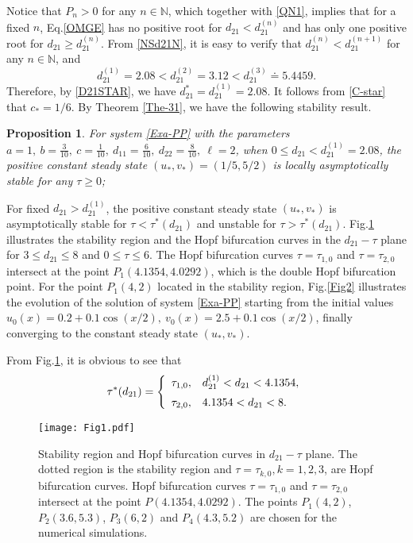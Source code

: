 \documentclass[11pt]{article}
\newtheorem{proposition}[theorem]{Proposition}
\theoremstyle{definition}
\theoremstyle{remark}
\numberwithin{equation}{section}
\begin{document}
Notice that $P_n>0$ for any $n\in \mathbb{N}$, which together with \eqref{QN1}, implies that for a fixed $n$,
 Eq.\eqref{OMGE} has no positive root for
$d_{21}<d_{21}^{(n)}$ and has only one positive root for $d_{21}\geq d_{21}^{(n)}$.
From \eqref{NSd21N},  it is easy to verify that $d_{21}^{(n)}<d_{21}^{(n+1)}$  for any $n\in \mathbb{N}$, and
$$
d_{21}^{(1)}=2.08< d_{21}^{(2)}=3.12<d_{21}^{(3)} \doteq 5.4459 .
$$
 Therefore,  by \eqref{D21STAR}, we have    $d_{21}^*=d_{21}^{(1)}=2.08$.   It follows from \eqref{C-star} that $c_*=1/6$. By Theorem  \eqref{The-31},  we  have the following stability result.
 \begin{proposition}
 \label{Pro-1}
For system \eqref{Exa-PP}  with the parameters $a=1, ~b=\frac{3}{10}, ~c=\frac{1}{10}, ~d_{11}=\frac{6}{10}, ~d_{22}=\frac{8}{10},~\ell=2$,
when $0\leq d_{21} < d_{21}^{(1)}=2.08$,   the positive constant steady state $(u_*, v_*)=(1/5,  5/2)$     is locally  asymptotically stable   for any $\tau\geq 0$;
  \end{proposition}
For fixed  $d_{21}>d_{21}^{(1)}$,    the positive constant steady state $(u_*, v_*)$  is asymptotically stable for $\tau<\tau^*(d_{21})$ and unstable for $\tau>\tau^*(d_{21})$.
 Fig.\ref{Fig1}  illustrates the stability region and the Hopf bifurcation curves in the $d_{21}-\tau$ plane for $3\leq d_{21}\leq 8$ and $0\leq\tau\leq 6$.  The Hopf bifurcation curves $\tau=\tau_{1,0}$  and $\tau=\tau_{2,0}$ intersect at the point $P_1(4.1354,4.0292)$, which is the double Hopf bifurcation point.  For the point $P_1(4, 2)$ located in the stability region, Fig.\ref{Fig2} illustrates the evolution of the solution of system \eqref{Exa-PP} starting from the initial values  $u_0(x)=0.2+0.1\cos(x/2),~v_0(x)=2.5+0.1\cos(x/2)$, finally converging to the constant steady state $(u_*, v_*)$.

 From Fig.\ref{Fig1}, it is obvious to see that
 $$
\tau^*(d_{21})=
\left\{
\begin{array}{ll}
\tau_{1,0}, & d_{21}^{(1)}<d_{21}<4.1354,\vspace{0.2cm}\\
\tau_{2,0}, &  4.1354<d_{21}<8.
\end{array}
\right.
 $$
\begin{figure}
\centering
{\texttt{[image: Fig1.pdf]}}
 \caption{Stability region and Hopf bifurcation curves in $d_{21}-\tau$ plane. The dotted region is the stability region and $\tau=\tau_{k, 0}, k=1,2,3$, are Hopf bifurcation curves. Hopf bifurcation curves $\tau=\tau_{1,0}$  and $\tau=\tau_{2,0}$ intersect at the point $P(4.1354,4.0292)$. The points $P_1(4, 2)$, $P_2(3.6,  5.3)$, $P_3(6,  2)$ and $P_4(4.3, 5.2)$ are chosen for the numerical simulations.  }
 \label{Fig1}
\end{figure}
\end{document}
